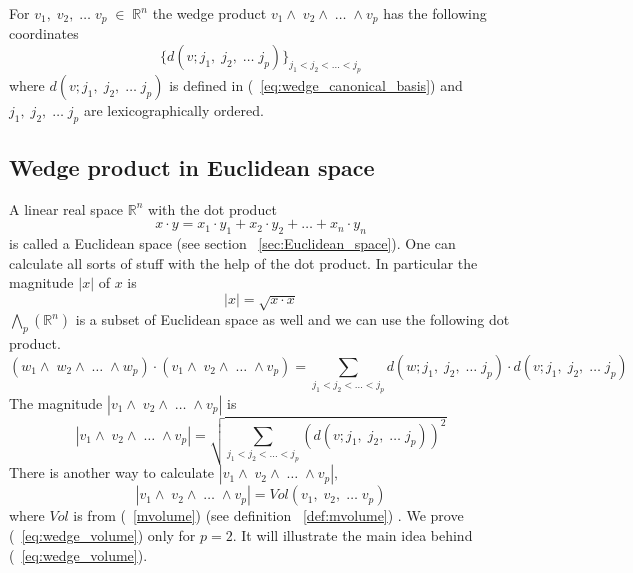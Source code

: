 \documentclass[color=black,11pt]{elegantpaper}
\begin{document}
For $v_1,\;v_2,\;\dots\; v_p\;\in\;\mathbb{R}^n$ the wedge product $v_1\wedge \;v_2\wedge \;\dots\; \wedge v_p$
has the following coordinates
$$
\{ d(v;j_1,\;j_2,\;\dots\;j_p)\}_{j_1<j_2<\dots<j_p } 
$$
where $d(v;j_1,\;j_2,\;\dots\;j_p)$ is defined in (~\ref{eq:wedge_canonical_basis}) and $j_1,\;j_2,\;\dots\;j_p$ are lexicographically ordered.
\subsection{Wedge product in Euclidean space}
A linear real space $\mathbb{R}^n$ with the dot product 
$$
x\cdot y = x_1 \cdot y_1 + x_2 \cdot y_2 + \dots + x_n \cdot y_n
$$
is called a Euclidean space (see section ~\ref{sec:Euclidean_space}).  One can calculate all sorts of stuff  with the help of the dot product. In particular the magnitude $|x|$ of $x$ is
$$
|x| = \sqrt{x\cdot x}
$$
 ${\bigwedge}_p (\mathbb{R}^n)$ is a subset of Euclidean space as well and we can use the following dot product.
$$
(w_1\wedge \;w_2\wedge \;\dots\; \wedge w_p)\cdot (v_1\wedge \;v_2\wedge \;\dots\; \wedge v_p) = \sum_{j_1<j_2<\dots<j_p} d(w;j_1,\;j_2,\;\dots\;j_p)\cdot d(v;j_1,\;j_2,\;\dots\;j_p)
$$
The magnitude $|v_1\wedge \;v_2\wedge \;\dots\; \wedge v_p|$ is
$$
|v_1\wedge \;v_2\wedge \;\dots\; \wedge v_p| = \sqrt{ \sum_{j_1<j_2<\dots<j_p} (d(v;j_1,\;j_2,\;\dots\;j_p))^2  }
$$
There is another way to calculate $|v_1\wedge \;v_2\wedge \;\dots\; \wedge v_p|,$
\begin{equation}
\label{eq:wedge_volume}
|v_1\wedge \;v_2\wedge \;\dots\; \wedge v_p| = Vol (v_1, \;v_2, \;\dots\;  v_p)
\end{equation}
where $Vol$ is from (~\ref{mvolume}) (see definition ~\ref{def:mvolume}) . We prove (~\ref{eq:wedge_volume}) only for $p=2.$ It will illustrate the main idea behind (~\ref{eq:wedge_volume}). \\
\end{document}
